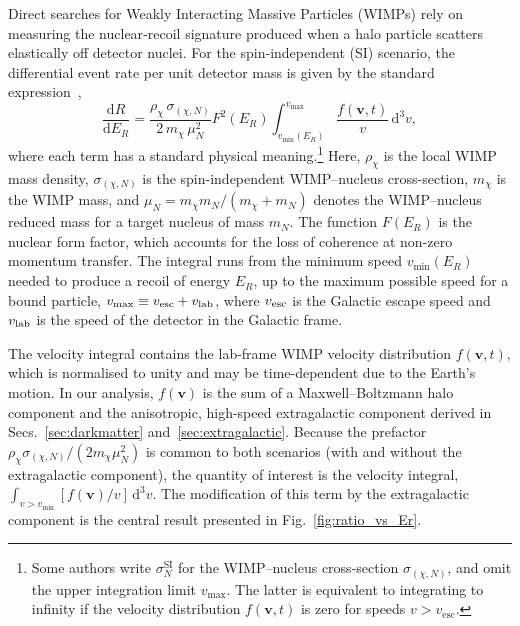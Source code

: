 \documentclass[%
 reprint,
 amsmath,amssymb,
 aps,
]{revtex4-2}
\begin{document}
Direct searches for Weakly Interacting Massive Particles (WIMPs) rely on measuring the
nuclear‐recoil signature produced when a halo particle
scatters elastically off detector nuclei.
For the spin‐independent (SI) scenario, the
differential event rate per unit detector mass is given by the
standard expression~\cite{Lewin1996,Bruch2009DarkDisk},
\begin{equation}
  \frac{\mathrm{d}R}{\mathrm{d}E_R}
  = \frac{\rho_\chi\,\sigma_{(\chi,N)}}{2\,m_\chi\,\mu_N^{2}}
    F^{2}(E_R)
    \int_{v_{\min}(E_R)}^{v_{\max}}
      \frac{f(\mathbf v,t)}{v}\,\mathrm d^{3}v,
\label{eq:dRdE-standard}
\end{equation}
where each term has a standard physical meaning.\footnote{Some authors write \(\sigma_N^{\mathrm{SI}}\) for the WIMP–nucleus cross-section \(\sigma_{(\chi,N)}\), and omit the upper integration limit \(v_{\max}\). The latter is equivalent to integrating to infinity if the velocity distribution \(f(\mathbf v,t)\) is zero for speeds \(v > v_{\mathrm{esc}}\).}
Here, \(\rho_\chi\) is the local WIMP mass density,
\(\sigma_{(\chi,N)}\) is the spin-independent WIMP–nucleus cross-section,
\(m_\chi\) is the WIMP mass,
and \(\mu_N = m_\chi m_N/(m_\chi + m_N)\) denotes the
WIMP–nucleus reduced mass for a target nucleus of mass \(m_N\).
The function \(F(E_R)\) is the nuclear form factor, which accounts
for the loss of coherence at non-zero momentum transfer.
The integral runs from the minimum speed \(v_{\min}(E_R)\) needed to
produce a recoil of energy \(E_R\), up to the maximum possible
speed for a bound particle, \(v_{\max} \equiv v_{\rm esc}+v_{\rm lab}\),
where \(v_{\rm esc}\) is the Galactic escape speed and \(v_{\rm lab}\) is
the speed of the detector in the Galactic frame.

The velocity integral contains the lab-frame WIMP velocity
distribution \(f(\mathbf v, t)\), which is normalised to unity
and may be time-dependent due to the Earth's motion.
In our analysis, \(f(\mathbf v)\) is the sum of a
Maxwell–Boltzmann halo component and the anisotropic,
high-speed extragalactic component derived in
Secs.~\ref{sec:darkmatter} and~\ref{sec:extragalactic}.
Because the prefactor
\(\rho_\chi\sigma_{(\chi,N)} /
  (2 m_\chi \mu_N^{2})\)
is common to both scenarios (with and without the extragalactic component),
the quantity of interest
is the velocity integral, 
\(\int_{v>v_{\min}} [f(\mathbf v)/v] \,\mathrm d^{3}v\).
The modification of this term by the extragalactic component is
the central result presented in Fig.~\ref{fig:ratio_vs_Er}.
\end{document}
